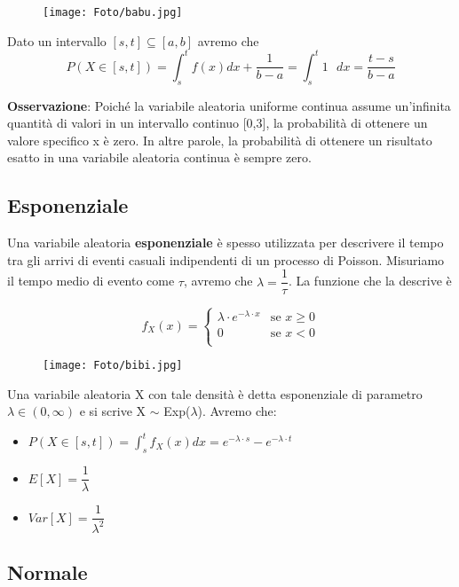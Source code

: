 \begin{figure}[h!]
    \centering
    \texttt{[image: Foto/babu.jpg]}
\end{figure}

\noindent Dato un intervallo $[s,t] \subseteq [a,b]$  avremo che $$P(X \in [s,t]) = \int_s^t f(x) dx + \dfrac{1}{b-a} = \int_s^t 1 \text{ } dx = \dfrac{t-s}{b-a}$$

\noindent \textbf{Osservazione}: Poiché la variabile aleatoria uniforme continua assume un'infinita quantità di valori in un intervallo continuo [0,3], la probabilità di ottenere un valore specifico x è zero. In altre parole, la probabilità di ottenere un risultato esatto in una variabile aleatoria continua è sempre zero. 

\subsection{Esponenziale}

Una variabile aleatoria \textbf{esponenziale} è spesso utilizzata per descrivere il tempo tra gli arrivi di eventi casuali indipendenti di un processo di Poisson. Misuriamo il tempo medio di evento come $\tau$, avremo che $\lambda = \dfrac{1}{\tau}$. La funzione che la descrive è

\begin{equation}
  f_X(x) =
    \begin{cases}
      \lambda \cdot e^{-\lambda \cdot x}& \text{se } x \geq 0\\
      0 & \text{se } x < 0\\
    \end{cases}       
\end{equation}

\begin{figure}[h!]
    \centering
    \texttt{[image: Foto/bibi.jpg]} 
\end{figure}

\noindent Una variabile aleatoria X con tale densità è detta esponenziale di parametro $\lambda \in (0, \infty) $ e si scrive X $\sim$ Exp($\lambda$). Avremo che:
\begin{itemize}
    \item $P(X \in [s,t]) = \int_s^t f_X(x)dx = e^{- \lambda \cdot s} - e^{- \lambda \cdot t}$
    \item $E[X] = \dfrac{1}{\lambda}$
    \item $Var[X] = \dfrac{1}{\lambda^2}$
\end{itemize}
\newpage
\subsection{Normale}

